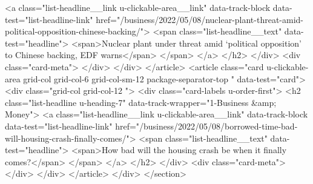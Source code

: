 {{{<a class="list-headline__link u-clickable-area__link" data-track-block data-test="list-headline-link" href="/business/2022/05/08/nuclear-plant-threat-amid-political-opposition-chinese-backing/">
<span class="list-headline__text" data-test="headline">
<span>Nuclear plant under threat amid ‘political opposition’ to Chinese backing, EDF warns</span>
</span>
</a>
</h2>
</div>
<div class="card-meta">
</div>
</div>
</article>
<article class="card u-clickable-area grid-col grid-col-6 grid-col-sm-12 package-separator-top " data-test="card">
<div class="grid-col grid-col-12  ">
<div class="card-labels u-order-first">
<h2 class="list-headline  u-heading-7" data-track-wrapper="1-Business &amp; Money">
<a class="list-headline__link u-clickable-area__link" data-track-block data-test="list-headline-link" href="/business/2022/05/08/borrowed-time-bad-will-housing-crash-finally-comes/">
<span class="list-headline__text" data-test="headline">
<span>How bad will the housing crash be when it finally comes?</span>
</span>
</a>
</h2>
</div>
<div class="card-meta">
</div>
</div>
</article>
</div>
</section>

	
		
			
		
}}}
